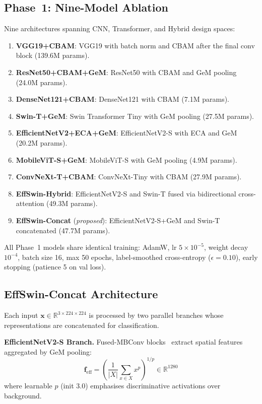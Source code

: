 \documentclass[conference]{IEEEtran}
\begin{document}
\subsection{Phase~1: Nine-Model Ablation}
Nine architectures spanning CNN, Transformer, and Hybrid design spaces:
\begin{enumerate}
    \item \textbf{VGG19+CBAM}: VGG19 with batch norm and CBAM after the final conv block (139.6M params).
    \item \textbf{ResNet50+CBAM+GeM}: ResNet50 with CBAM and GeM pooling (24.0M params).
    \item \textbf{DenseNet121+CBAM}: DenseNet121 with CBAM (7.1M params).
    \item \textbf{Swin-T+GeM}: Swin Transformer Tiny with GeM pooling (27.5M params).
    \item \textbf{EfficientNetV2+ECA+GeM}: EfficientNetV2-S with ECA and GeM (20.2M params).
    \item \textbf{MobileViT-S+GeM}: MobileViT-S with GeM pooling (4.9M params).
    \item \textbf{ConvNeXt-T+CBAM}: ConvNeXt-Tiny with CBAM (27.9M params).
    \item \textbf{EffSwin-Hybrid}: EfficientNetV2-S and Swin-T fused via bidirectional cross-attention (49.3M params).
    \item \textbf{EffSwin-Concat} (\textit{proposed}): EfficientNetV2-S+GeM and Swin-T concatenated (47.7M params).
\end{enumerate}
All Phase~1 models share identical training: AdamW, lr $5\times10^{-5}$, weight decay $10^{-4}$, batch size 16, max 50 epochs, label-smoothed cross-entropy ($\epsilon{=}0.10$), early stopping (patience 5 on val loss).

\subsection{EffSwin-Concat Architecture}
Each input $\mathbf{x}\in\mathbb{R}^{3\times224\times224}$ is processed by two parallel branches whose representations are concatenated for classification.

\textbf{EfficientNetV2-S Branch.} Fused-MBConv blocks~\cite{b18} extract spatial features aggregated by GeM pooling:
\begin{equation}
\mathbf{f}_{\text{eff}}=\!\left(\frac{1}{|X|}\sum_{x\in X}x^{p}\right)^{\!1/p}\in\mathbb{R}^{1280}
\end{equation}
where learnable $p$ (init 3.0) emphasises discriminative activations over background.
\end{document}
